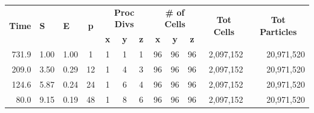 \documentclass[]{article}
\begin{document}
\begin{table}[h!]
\centering
\begin{tabular}{|r|r|r|c|c|c|c|c|c|c|r|r|}
\hline
\multicolumn{1}{|c|}{\multirow{2}{*}{\textbf{Time}}} & \multicolumn{1}{l|}{\multirow{2}{*}{\textbf{S}}} & \multicolumn{1}{l|}{\multirow{2}{*}{\textbf{E}}} & \multirow{2}{*}{\textbf{p}} & \multicolumn{3}{c|}{\textbf{Proc Divs}} & \multicolumn{3}{c|}{\textbf{\# of Cells}} & \multicolumn{1}{c|}{\multirow{2}{*}{\textbf{Tot Cells}}} & \multicolumn{1}{c|}{\multirow{2}{*}{\textbf{Tot Particles}}} \\ \cline{5-10}
\multicolumn{1}{|c|}{}                               & \multicolumn{1}{l|}{}                            & \multicolumn{1}{l|}{}                            &                             & \textbf{x}  & \textbf{y}  & \textbf{z}  & \textbf{x}   & \textbf{y}   & \textbf{z}  & \multicolumn{1}{c|}{}                                    & \multicolumn{1}{c|}{}                                        \\ \hline
731.9                                                & 1.00                                             & 1.00                                             & 1                           & 1           & 1           & 1           & 96           & 96           & 96          & 2,097,152                                                & 20,971,520                                                   \\ \hline
209.0                                                & 3.50                                             & 0.29                                             & 12                          & 1           & 4           & 3           & 96           & 96           & 96          & 2,097,152                                                & 20,971,520                                                   \\ \hline
124.6                                                & 5.87                                             & 0.24                                             & 24                          & 1           & 6           & 4           & 96           & 96           & 96          & 2,097,152                                                & 20,971,520                                                   \\ \hline
80.0                                                 & 9.15                                             & 0.19                                             & 48                          & 1           & 8           & 6           & 96           & 96           & 96          & 2,097,152                                                & 20,971,520                                                   \\ \hline

\end{tabular}
\end{table}
\end{document}
